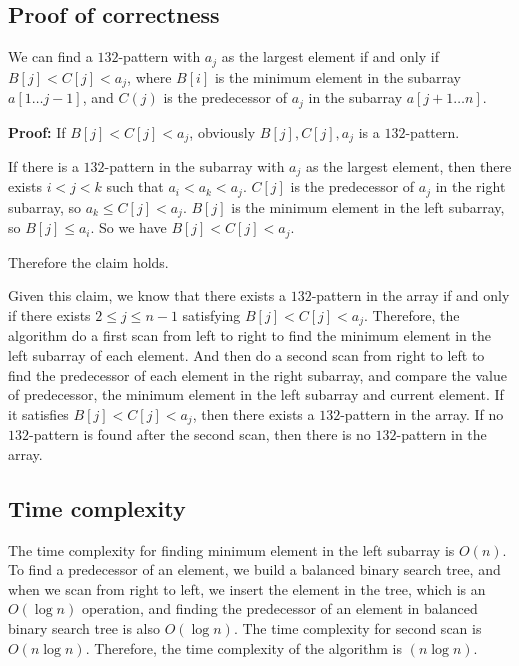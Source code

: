 \documentclass[paper=a4, fontsize=11pt]{scrartcl} %
\numberwithin{equation}{section} %
\numberwithin{figure}{section} %
\numberwithin{table}{section} %
\newcounter{claimcounter}
\numberwithin{claimcounter}{section}
\newenvironment{claim}{\stepcounter{claimcounter}{\textbf{Claim \theclaimcounter:}}}{}
\begin{document}
\subsection*{Proof of correctness}
\begin{claim}
  We can find a $132$-pattern with $a_j$ as the largest element if and only if
  $B[j] < C[j] < a_j$, where $B[i]$ is the minimum element in the subarray
  $a[1\dots j-1]$, and $C(j)$ is the predecessor of $a_j$ in the subarray
  $a[j+1\dots n]$.
\end{claim}

\textbf{Proof:}
If $B[j] < C[j] < a_j$, obviously $B[j], C[j], a_j$ is a $132$-pattern.

If there is a $132$-pattern in the subarray with $a_j$ as the largest element,
then there exists $i < j < k$ such that $a_i < a_k < a_j$. $C[j]$ is the 
predecessor of $a_j$ in the right subarray, so $a_k \leq C[j] < a_j$.
$B[j]$ is the minimum element in the left subarray, so $B[j] \leq a_i$.
So we have $B[j] < C[j] < a_j$.

Therefore the claim holds.
\vspace{0.5cm}

Given this claim, we know that there exists a $132$-pattern in the array
if and only if there exists $2 \leq j \leq n-1$ satisfying $B[j] < C[j] < a_j$.
Therefore, the algorithm do a first scan from left to right to find the minimum 
element in the left subarray of each element. And then do a second scan from 
right to left to find the predecessor of each element in the right subarray, and
compare the value of predecessor, the minimum element in the left subarray and
current element. If it satisfies $B[j] < C[j] < a_j$, then there exists a 
$132$-pattern in the array. If no $132$-pattern is found after the second scan,
then there is no $132$-pattern in the array.

\subsection*{Time complexity}
The time complexity for finding minimum element in the left subarray is $O(n)$.
To find a predecessor of an element, we build a balanced binary search tree,
and when we scan from right to left, we insert the element in the tree, which is 
an $O(\log n)$ operation, and finding the predecessor of an element in balanced
binary search tree is also $O(\log n)$. The time complexity for
second scan is $O(n\log n)$. Therefore, the time complexity of the algorithm is
$(n\log n)$.
\end{document}
